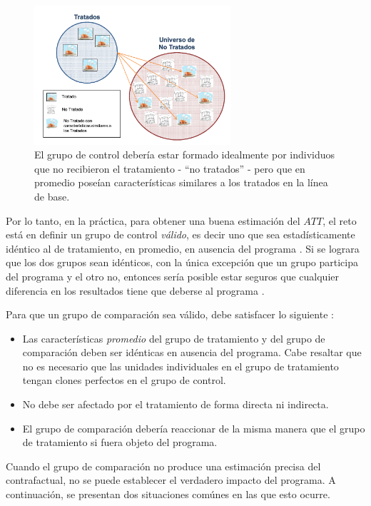 \documentclass[../../main.tex]{subfiles}
\begin{document}
\begin{figure}[ht]
    \centering
    \includegraphics[width=0.65\textwidth]{figs/grupo-de-control.png}
    \caption{El grupo de control debería estar formado idealmente por individuos que no
    recibieron el tratamiento - ``no tratados'' - pero que en promedio poseían
    características similares a los tratados en la línea de base.}
    \label{fig:control-group}
\end{figure}

Por lo tanto, en la práctica, para obtener una buena estimación del \(ATT\), el reto está
en definir un grupo de control \textit{válido}, es decir uno que sea estadísticamente
idéntico al de tratamiento, en promedio, en ausencia del programa \cite{gertler-2016}. Si
se lograra que los dos grupos sean idénticos, con la única excepción que un grupo
participa del programa y el otro no, entonces sería posible estar seguros que cualquier
diferencia en los resultados tiene que deberse al programa \cite{gertler-2016}.

Para que un grupo de comparación sea válido, debe satisfacer lo siguiente \cite{gertler-2016}:
\begin{itemize}
    \item Las características \textit{promedio} del grupo de tratamiento y del grupo de
    comparación deben ser idénticas en ausencia del programa. Cabe resaltar que no es
    necesario que las unidades individuales en el grupo de tratamiento tengan clones
    perfectos en el grupo de control.
    \item No debe ser afectado por el tratamiento de forma directa ni indirecta.
    \item El grupo de comparación debería reaccionar de la misma manera que el grupo de
    tratamiento si fuera objeto del programa.
\end{itemize}

Cuando el grupo de comparación no produce una estimación precisa del contrafactual, no se
puede establecer el verdadero impacto del programa. A continuación, se presentan dos
situaciones comúnes en las que esto ocurre.
\end{document}
